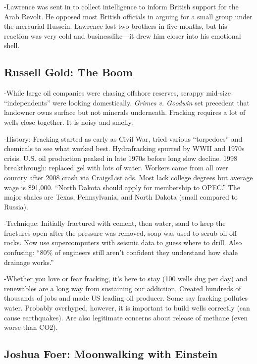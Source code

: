 \documentclass[
]{article}
\begin{document}
-Lawrence was sent in to collect intelligence to inform British support
for the Arab Revolt. He opposed most British officials in arguing for a
small group under the mercurial Hussein. Lawrence lost two brothers in
five months, but his reaction was very cold and businesslike---it drew
him closer into his emotional shell.

\hypertarget{russell-gold-the-boom}{%
\subsection{Russell Gold: The Boom}\label{russell-gold-the-boom}}

-While large oil companies were chasing offshore reserves, scrappy
mid-size ``independents'' were looking domestically. \emph{Grimes v.
Goodwin} set precedent that landowner owns surface but not minerals
underneath. Fracking requires a lot of wells close together. It is noisy
and smelly.

-History: Fracking started as early as Civil War, tried various
``torpedoes'' and chemicals to see what worked best. Hydrafracking
spurred by WWII and 1970s crisis. U.S. oil production peaked in late
1970s before long slow decline. 1998 breakthrough: replaced gel with
lots of water. Workers came from all over country after 2008 crash via
CraigsList ads. Most lack college degrees but average wage is \$91,000.
``North Dakota should apply for membership to OPEC.'' The major shales
are Texas, Pennsylvania, and North Dakota (small compared to Russia).

-Technique: Initially fractured with cement, then water, sand to keep
the fractures open after the pressure was removed, soap was used to
scrub oil off rocks. Now use supercomputers with seismic data to guess
where to drill. Also confusing: ``80\% of engineers still aren't
confident they understand how shale drainage works.''

-Whether you love or fear fracking, it's here to stay (100 wells dug per
day) and renewables are a long way from sustaining our addiction.
Created hundreds of thousands of jobs and made US leading oil producer.
Some say fracking pollutes water. Probably overhyped, however, it is
important to build wells correctly (can cause earthquakes). Are also
legitimate concerns about release of methane (even worse than CO2).

\hypertarget{joshua-foer-moonwalking-with-einstein}{%
\subsection{Joshua Foer: Moonwalking with
Einstein}\label{joshua-foer-moonwalking-with-einstein}}
\end{document}
